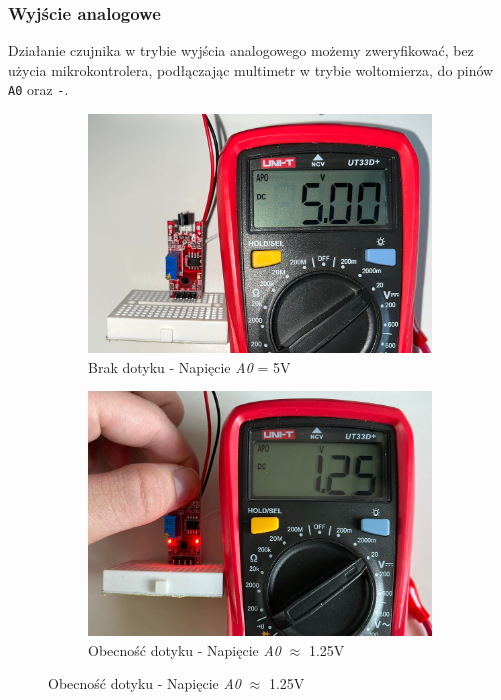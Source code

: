 \documentclass[11pt, a4paper]{article}
\begin{document}
\subsubsection{Wyjście analogowe}
Działanie czujnika w trybie wyjścia analogowego możemy zweryfikować, bez użycia mikrokontrolera, podłączając multimetr
w trybie woltomierza, do pinów \texttt{A0} oraz \texttt{-}.

\vspace{0.25cm}
\begin{figure}[h]
\centering
\begin{subfigure}{.5\textwidth}
\centering
\includegraphics[width=.9\linewidth]{fig/KY-036/282820859_337533828451797_8222466624857442728_n}
\caption{Brak dotyku - Napięcie \textit{A0} = 5V}
\label{fig:_uklad_woltomierz_otw}
\end{subfigure}%
\begin{subfigure}{.5\textwidth}
\centering
\includegraphics[width=.9\linewidth]{fig/KY-036/282838602_740656317115777_5297824243567198867_n}
\caption{Obecność dotyku - Napięcie \textit{A0} $\approx$ 1.25V}
\label{fig:_uklad_woltomierz_zmk}
\end{subfigure}
\label{fig:woltomierz}
\end{figure}
\vspace{0.25cm}
\end{document}
